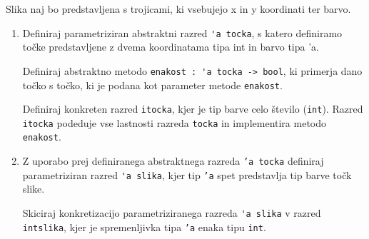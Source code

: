 \begin{ex}
Slika naj bo predstavljena s trojicami, ki vsebujejo x in y koordinati ter barvo.

\begin{enumerate}
\item Definiraj parametriziran abstraktni razred \lstinline{'a tocka}, s katero definiramo to\v cke predstavljene z dvema koordinatama tipa int in barvo tipa 'a. 

Definiraj abstraktno metodo \lstinline{enakost : 'a tocka -> bool}, ki primerja dano to\v cko s to\v cko, ki je podana kot parameter metode \texttt{enakost}.

Definiraj konkreten razred \lstinline{itocka}, kjer je tip barve celo \v stevilo (\texttt{int}). Razred \texttt{itocka} podeduje vse lastnosti razreda \texttt{tocka} in implementira metodo \texttt{enakost}.

\item Z uporabo prej definiranega abstraktnega razreda \texttt{'a tocka} definiraj parametriziran razred \lstinline{'a slika}, kjer tip \texttt{'a} spet predstavlja tip barve to\v ck slike. 

Skiciraj konkretizacijo parametriziranega razreda \lstinline{'a slika} v razred \lstinline{intslika}, kjer je spremenljivka tipa \texttt{'a} enaka tipu \texttt{int}.
\end{enumerate}
\end{ex}








